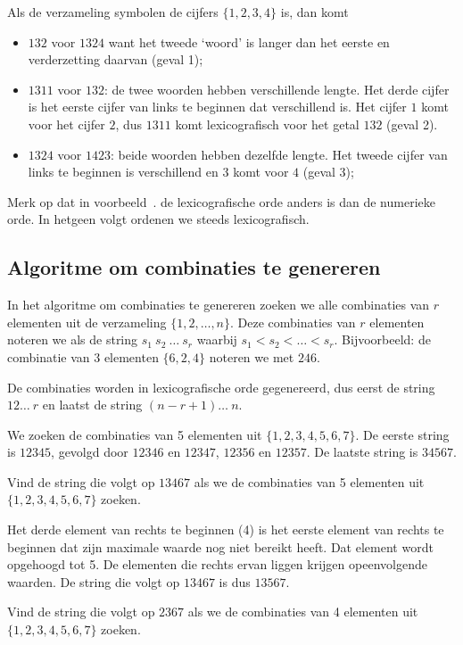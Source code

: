 \voorbeeld
Als de verzameling symbolen de cijfers $\{1,2,3,4\}$ is, dan komt 
\begin{itemize}
\item $132$ voor $1324$ want het tweede `woord' is langer dan het eerste en verderzetting daarvan (geval 1);
\item $1311$ voor $132$: de twee woorden hebben verschillende lengte. Het derde cijfer is het eerste cijfer van links te beginnen dat verschillend is. Het cijfer $1$ komt voor het cijfer $2$, dus $1311$ komt lexicografisch voor het getal $132$ (geval 2).
\item $1324$ voor $1423$: beide woorden hebben dezelfde lengte. Het tweede cijfer van links te beginnen is verschillend en $3$ komt voor $4$ (geval 3);
\end{itemize}

Merk op dat in voorbeeld~\thesection. de lexicografische orde anders is dan de numerieke orde. In hetgeen volgt ordenen we steeds lexicografisch. 

\subsection{Algoritme om combinaties te genereren}
In het algoritme om combinaties te genereren zoeken we alle combinaties van $r$ elementen uit de verzameling $\{1,2,\dots,n\}$. Deze combinaties van $r$ elementen noteren we als de string $s_1~s_2~\dots~s_r$ waarbij $s_1<s_2<\dots<s_r$. Bijvoorbeeld: de combinatie van 3 elementen $\{6,2,4\}$ noteren we met $246$.

De combinaties worden in lexicografische orde gegenereerd, dus eerst de string $12\dots\ r$ en laatst de string $(n-r+1)\dots\ n$.

\voorbeeld
We zoeken de combinaties van 5 elementen uit $\{1,2,3,4,5,6,7\}$. De eerste string is $12345$, gevolgd door $12346$ en $12347$,  $12356$ en $12357$. De laatste string is $34567$.

\voorbeeld
Vind de string die volgt op $13467$ als we de combinaties van 5 elementen uit $\{1,2,3,4,5,6,7\}$ zoeken.

Het derde element van rechts te beginnen (4) is het eerste element van rechts te beginnen dat zijn maximale waarde nog niet bereikt heeft. Dat element wordt opgehoogd tot 5. De elementen die rechts ervan liggen krijgen opeenvolgende waarden. De string die volgt op $13467$ is dus $13567$.

\voorbeeld
Vind de string die volgt op $2367$ als we de combinaties van 4 elementen uit $\{1,2,3,4,5,6,7\}$ zoeken.

